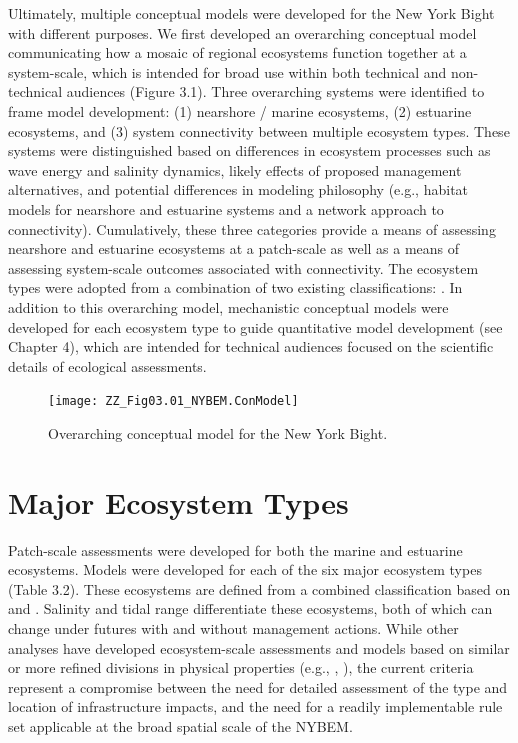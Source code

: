 \documentclass[
]{book}
\begin{document}
Ultimately, multiple conceptual models were developed for the New York Bight with different purposes. We first developed an overarching conceptual model communicating how a mosaic of regional ecosystems function together at a system-scale, which is intended for broad use within both technical and non-technical audiences (Figure 3.1). Three overarching systems were identified to frame model development: (1) nearshore / marine ecosystems, (2) estuarine ecosystems, and (3) system connectivity between multiple ecosystem types. These systems were distinguished based on differences in ecosystem processes such as wave energy and salinity dynamics, likely effects of proposed management alternatives, and potential differences in modeling philosophy (e.g., habitat models for nearshore and estuarine systems and a network approach to connectivity). Cumulatively, these three categories provide a means of assessing nearshore and estuarine ecosystems at a patch-scale as well as a means of assessing system-scale outcomes associated with connectivity. The ecosystem types were adopted from a combination of two existing classifications: \citep{cowardin_classification_1979, us_fish_and_wildlife_service_usfws_significant_1997}. In addition to this overarching model, mechanistic conceptual models were developed for each ecosystem type to guide quantitative model development (see Chapter 4), which are intended for technical audiences focused on the scientific details of ecological assessments.

\begin{figure}
\texttt{[image: ZZ\_Fig03.01\_NYBEM.ConModel]} \caption{Overarching conceptual model for the New York Bight.}\label{fig:unnamed-chunk-6}
\end{figure}

\hypertarget{major-ecosystem-types}{%
\section{Major Ecosystem Types}\label{major-ecosystem-types}}

Patch-scale assessments were developed for both the marine and estuarine ecosystems. Models were developed for each of the six major ecosystem types (Table 3.2). These ecosystems are defined from a combined classification based on \citet{cowardin_classification_1979} and \citet{us_fish_and_wildlife_service_usfws_significant_1997}. Salinity and tidal range differentiate these ecosystems, both of which can change under futures with and without management actions. While other analyses have developed ecosystem-scale assessments and models based on similar or more refined divisions in physical properties (e.g., \citet{clough_modeling_2016}, \citet{fischenich_application_2008}), the current criteria represent a compromise between the need for detailed assessment of the type and location of infrastructure impacts, and the need for a readily implementable rule set applicable at the broad spatial scale of the NYBEM.
\end{document}
